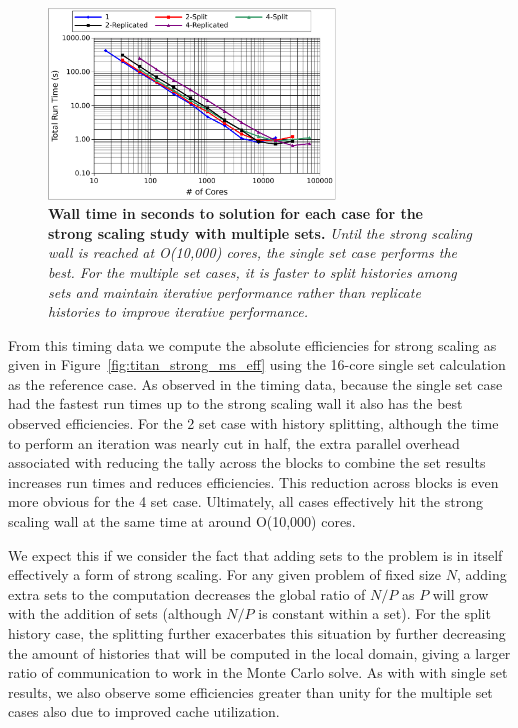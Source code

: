 \documentclass{snamc2013}
\begin{document}
\begin{figure}[h!]
  \begin{center}
    \includegraphics[width=3in]{titan_strong_ms_time.pdf}
  \end{center}
  \caption{\textbf{Wall time in seconds to solution for each case for
      the strong scaling study with multiple sets.} \textit{Until the
      strong scaling wall is reached at O(10,000) cores, the single
      set case performs the best. For the multiple set cases, it is
      faster to split histories among sets and maintain iterative
      performance rather than replicate histories to improve iterative
      performance.}}
  \label{fig:titan_strong_ms_time}
\end{figure}

From this timing data we compute the absolute efficiencies for strong
scaling as given in Figure~\ref{fig:titan_strong_ms_eff} using the
16-core single set calculation as the reference case. As observed in
the timing data, because the single set case had the fastest run times
up to the strong scaling wall it also has the best observed
efficiencies. For the 2 set case with history splitting, although the
time to perform an iteration was nearly cut in half, the extra
parallel overhead associated with reducing the tally across the blocks
to combine the set results increases run times and reduces
efficiencies. This reduction across blocks is even more obvious for
the 4 set case. Ultimately, all cases effectively hit the strong
scaling wall at the same time at around O(10,000) cores.

We expect this if we consider the fact that adding sets to the problem
is in itself effectively a form of strong scaling. For any given
problem of fixed size $N$, adding extra sets to the computation
decreases the global ratio of $N/P$ as $P$ will grow with the addition
of sets (although $N/P$ is constant within a set). For the split
history case, the splitting further exacerbates this situation by
further decreasing the amount of histories that will be computed in
the local domain, giving a larger ratio of communication to work in
the Monte Carlo solve. As with with single set results, we also
observe some efficiencies greater than unity for the multiple set
cases also due to improved cache utilization. 
\end{document}
